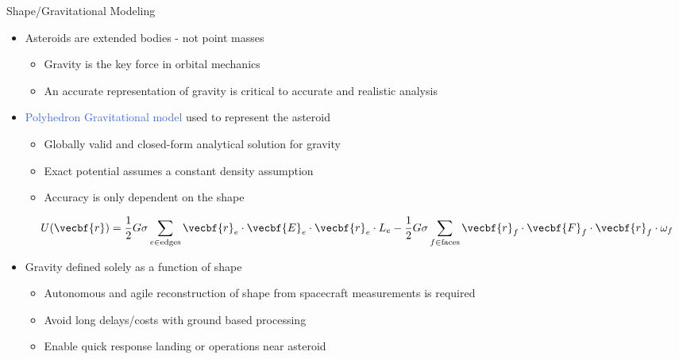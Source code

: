 \documentclass[final, usenames, dvipsnames]{beamer}
\newlength{\onecolwidth}
\def\Emph{\textcolor{RoyalBlue}}
\begin{document}
\begin{frame}[t]
\begin{columns}[T,onlytextwidth]
\begin{column}{\onecolwidth}
        \begin{block}{Shape/Gravitational Modeling}
            \begin{itemize}
                \item Asteroids are extended bodies - not point masses
                    \begin{itemize}
                        \item Gravity is the key force in orbital mechanics
                        \item An accurate representation of gravity is critical to accurate and realistic analysis
                    \end{itemize}
                \item \Emph{Polyhedron Gravitational model} used to represent the asteroid
                    \begin{itemize}
                        \item Globally valid and closed-form analytical solution for gravity
                        \item Exact potential assumes a constant density assumption
                        \item Accuracy is only dependent on the shape
                    \end{itemize}
                    \[
                        U(\vecbf{r}) = \frac{1}{2} G \sigma \sum_{e \in
                        \text{edges}} \vecbf{r}_e \cdot \vecbf{E}_e \cdot
                        \vecbf{r}_e \cdot L_e - \frac{1}{2}G \sigma \sum_{f \in
                        \text{faces}} \vecbf{r}_f \cdot \vecbf{F}_f \cdot
                        \vecbf{r}_f \cdot \omega_f 
                    \]	
                \item Gravity defined solely as a function of shape
                    \begin{itemize}
                        \item Autonomous and agile reconstruction of shape from spacecraft measurements is required
                        \item Avoid long delays/costs with ground based processing
                        \item Enable quick response landing or operations near asteroid 
                    \end{itemize}
            \end{itemize}
            \vspace*{1.5cm}
        \end{block} 
\end{column}  %


\end{columns}
\end{frame}
\end{document}
